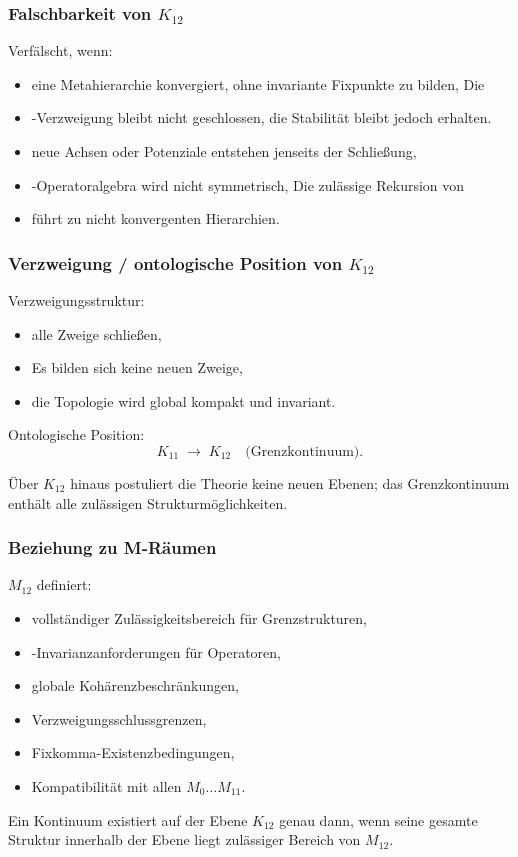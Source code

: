 \subsubsection{Falschbarkeit von $K_{12}$}

Verfälscht, wenn:
\begin{itemize}
    \item eine Metahierarchie konvergiert, ohne invariante Fixpunkte zu bilden,
    Die \item-Verzweigung bleibt nicht geschlossen, die Stabilität bleibt jedoch erhalten.
    \item neue Achsen oder Potenziale entstehen jenseits der Schließung,
    \item-Operatoralgebra wird nicht symmetrisch,
    Die zulässige Rekursion von \item führt zu nicht konvergenten Hierarchien.
\end{itemize}

\subsubsection{Verzweigung / ontologische Position von $K_{12}$}

Verzweigungsstruktur:
\begin{itemize}
    \item alle Zweige schließen,
    \item Es bilden sich keine neuen Zweige,
    \item die Topologie wird global kompakt und invariant.
\end{itemize}

Ontologische Position:
\[
K_{11} \;\longrightarrow\; K_{12} \quad \text{(Grenzkontinuum)}.
\]

Über $K_{12}$ hinaus postuliert die Theorie keine neuen Ebenen; das Grenzkontinuum
enthält alle zulässigen Strukturmöglichkeiten.

\subsubsection{Beziehung zu M-Räumen}

$M_{12}$ definiert:
\begin{itemize}
    \item vollständiger Zulässigkeitsbereich für Grenzstrukturen,
    \item-Invarianzanforderungen für Operatoren,
    \item globale Kohärenzbeschränkungen,
    \item Verzweigungsschlussgrenzen,
    \item Fixkomma-Existenzbedingungen,
    \item Kompatibilität mit allen $M_0\dots M_{11}$.
\end{itemize}

Ein Kontinuum existiert auf der Ebene $K_{12}$ genau dann, wenn seine gesamte Struktur innerhalb der Ebene liegt
zulässiger Bereich von $M_{12}$.
